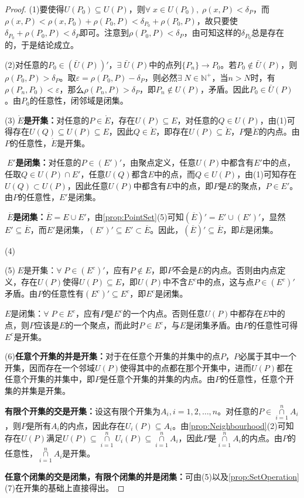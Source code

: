 \begin{proof}
	(1)要使得$U(P_0)\subseteq U(P)$，则$\forall\;x\in U(P_0),\;\rho(x,P)<\delta_P$，而$\rho(x,P)<\rho(x,P_0)+\rho(P_0,P)<\delta_{P_0}+\rho(P_0,P)$，故只要使$\delta_{P_0}+\rho(P_0,P)<\delta_P$即可。注意到$\rho(P_0,P)<\delta_P$，由可知这样的$\delta_{P_0}$总是存在的，于是结论成立。 \par
	(2)对任意的$P_0\in\left(\bar{U}(P)\right)'$，$\exists\;\bar{U}(P)$中的点列$\{P_n\}\to P_0$。若$P_0\notin \bar{U}(P)$，则$\rho(P_0,P)>\delta_P$。取$\varepsilon=\rho(P_0,P)-\delta_P$，则必然$\exists\;N\in\mathbb{N}^+$，当$n>N$时，有$\rho(P_n,P_0)<\varepsilon$，那么$\rho(P_n,P)>\delta_P$，即$P_n\notin U(P)$，矛盾。因此$P_0\in \bar{U}(P)$。由$P_0$的任意性，闭邻域是闭集。\par
	(3)\textbf{$\;\mathring{E}$是开集：}对任意的$P\in\mathring{E}$，存在$U(P)\subseteq E$，对任意的$Q\in U(P)$，由(1)可得存在$U(Q)\subseteq U(P)\subseteq E$，因此$Q\in\mathring{E}$，即存在$U(P)\subseteq\mathring{E}$，$P$是$\mathring{E}$的内点。由$P$的任意性，$\mathring{E}$是开集。\par
	\textbf{$\;E'$是闭集：}对任意的$P\in (E')'$，由聚点定义，任意$U(P)$中都含有$E'$中的点，任取$Q\in U(P)\cap E'$，任意$U(Q)$都含$E$中的点，而$Q\in U(P)$，由(1)可知存在$U(Q)\subset U(P)$，因此任意$U(P)$中都含有$E$中的点，即$P$是$E$的聚点，$P\in E'$。由$P$的任意性，$E'$是闭集。\par
	\textbf{$\;\overline{E}$是闭集：}$\overline{E}=E\cup E'$，由\cref{prop:PointSet}(5)可知$(\overline{E})'=E'\cup (E')'$，显然$E'\subseteq \overline{E}$，而$E'$是闭集，$(E')'\subseteq E'\subset\overline{E}$。因此，$(\overline{E})'\subseteq\overline{E}$，即$\overline{E}$是闭集。\par
	(4)\par
	(5)$\;E$是开集：$\forall\; P\in (E^c)'$，应有$P\notin E$，即$P$不会是$E$的内点。否则由内点定义，存在$U(P)$使得$U(P)\subseteq E$，即$U(P)$中不含$E^c$中的点，这与点$P\in (E^c)'$矛盾。由$P$的任意性有$(E^c)'\subseteq E^c$，即$E^c$是闭集。\par
	$E$是闭集：$\forall\; P\in E^c$，应有$P$是$E^c$的一个内点。否则任意$U(P)$中都存在$E$中的点，则$P$应该是$E$的一个聚点，而此时$P\in E^c$，与$E$是闭集矛盾。由$P$的任意性可得$E^c$是开集。\par
	(6)\textbf{任意个开集的并是开集：}对于在任意个开集的并集中的点$P$，$P$必属于其中一个开集，因而存在一个邻域$U(P)$使得其中的点都在那个开集中，进而$U(P)$都在任意个开集的并集中，即$P$是任意个开集的并集的内点。由$P$的任意性，任意个开集的并集是开集。\par
	\textbf{有限个开集的交是开集：}设这有限个开集为$A_i,i=1,2,\dots,n$。对任意的$ P\in\underset{i=1}{\overset{n}{\cap}}A_i$，则$P$是所有$A_i$的内点，因此存在$U_i(P)\subseteq A_i$。由\cref{prop:Neighbourhood}(2)可知存在$U(P)$满足$U(P)\subseteq\underset{i=1}{\overset{n}{\cap}}U_i(P)\subseteq\underset{i=1}{\overset{n}{\cap}}A_i$，因此$P$是$\underset{i=1}{\overset{n}{\cap}}A_i$的内点。由$P$的任意性，$\underset{i=1}{\overset{n}{\cap}}A_i$是开集。\par
	\textbf{任意个闭集的交是闭集，有限个闭集的并是闭集：}可由(5)以及\cref{prop:SetOperation}(7)在开集的基础上直接得出。
\end{proof}
